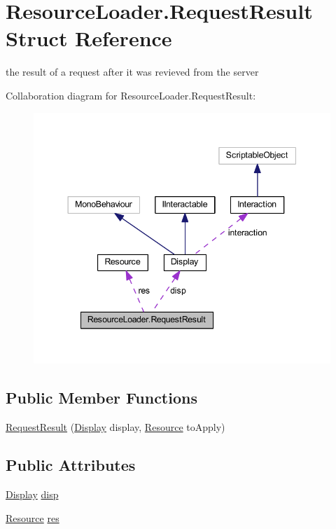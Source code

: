 \hypertarget{struct_resource_loader_1_1_request_result}{}\section{Resource\+Loader.\+Request\+Result Struct Reference}
\label{struct_resource_loader_1_1_request_result}


the result of a request after it was revieved from the server  




Collaboration diagram for Resource\+Loader.\+Request\+Result\+:
\nopagebreak
\begin{figure}[H]
\begin{center}
\leavevmode
\includegraphics[width=344pt]{struct_resource_loader_1_1_request_result__coll__graph}
\end{center}
\end{figure}
\subsection*{Public Member Functions}
\begin{DoxyCompactItemize}
\item 
\mbox{\hyperlink{struct_resource_loader_1_1_request_result_abd80016ba4672e51fb693cbacf32b196}{Request\+Result}} (\mbox{\hyperlink{class_display}{Display}} display, \mbox{\hyperlink{class_resource}{Resource}} to\+Apply)
\end{DoxyCompactItemize}
\subsection*{Public Attributes}
\begin{DoxyCompactItemize}
\item 
\mbox{\hyperlink{class_display}{Display}} \mbox{\hyperlink{struct_resource_loader_1_1_request_result_adde9cd4720ecbadfef0030b03cd31d00}{disp}}
\item 
\mbox{\hyperlink{class_resource}{Resource}} \mbox{\hyperlink{struct_resource_loader_1_1_request_result_a2353513b4074450d6c7dd353d17c0271}{res}}
\end{DoxyCompactItemize}



